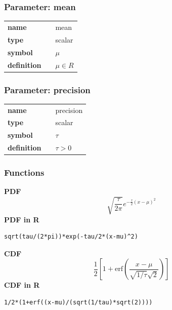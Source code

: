\subsubsection*{Parameter: mean}

\noindent\begin{tabular}{p{2cm}cl}
\textbf{name} & & mean \\
\textbf{type} & & scalar \\
\textbf{symbol} & & $\mu$  \\
\textbf{definition} & & $\mu \in R$
\end{tabular}
\subsubsection*{Parameter: precision}

\noindent\begin{tabular}{p{2cm}cl}
\textbf{name} & & precision \\
\textbf{type} & & scalar \\
\textbf{symbol} & & $\tau$  \\
\textbf{definition} & & $\tau>0$
\end{tabular}
\subsubsection*{Functions}

\smallskip \noindent \hspace{.2cm} \textbf{PDF} 
\begin{equation*}\sqrt{\frac{\tau}{2 \pi}} e^{-\frac{\tau}{2}(x-\mu)^2}\end{equation*}
\smallskip \noindent \hspace{.2cm} \textbf{PDF in R}  
\begin{verbatim}sqrt(tau/(2*pi))*exp(-tau/2*(x-mu)^2)\end{verbatim}
\smallskip \noindent \hspace{.2cm} \textbf{CDF} 
\begin{equation*}\frac12\left[1 + \text{erf}\left( \frac{x-\mu}{\sqrt{1/\tau}\sqrt{2}}\right)\right]\end{equation*}
\smallskip \noindent \hspace{.2cm} \textbf{CDF in R} 
\begin{verbatim}1/2*(1+erf((x-mu)/(sqrt(1/tau)*sqrt(2)))) \end{verbatim}
\smallskip
